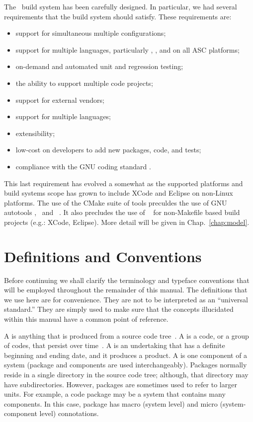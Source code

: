 The \draco\ build system has been carefully designed.  In particular,
we had several requirements that the build system should satisfy.
These requirements are:
\begin{itemize}
\item support for simultaneous multiple configurations;
\item support for multiple languages, particularly \cpp, \cc, and
  \python on all ASC platforms;
\item on-demand and automated unit and regression testing;
\item the ability to support multiple code projects;
\item support for external vendors;
\item support for multiple languages;
\item extensibility;
\item low-cost on developers to add new packages, code, and tests; 
\item compliance with the GNU coding standard \cite{gnu} .
\end{itemize}
This last requirement has evolved a somewhat as the supported
platforms and build systems scope has grown to include XCode and
Eclipse on non-Linux platforms.  The use of the CMake suite of tools
preculdes the use of GNU autotools ,
\autoconf\ and \automake~\cite{autoconf}.  
It also precludes the use of \make~\cite{gmake} for non-Makefile based
build projects (e.g.: XCode, Eclipse). More detail will be given in
Chap.~\ref{chap:model}. 


\section{Definitions and Conventions}

Before continuing we shall clarify the terminology and typeface
conventions that will be employed throughout the remainder of this
manual.  The definitions that we use here are for convenience.  They
are not to be interpreted as an ``universal standard.''  They are
simply used to make sure that the concepts illucidated within this
manual have a common point of reference.

A  is anything that is produced from a source code
tree~\cite{ja94}.  A  is a code, or a group of codes,
that persist over time~\cite{tn98}.  A  is an
undertaking that has a definite beginning and ending date, and it
produces a product.  A  is one component of a system
(package and components are used interchangeably).  Packages normally
reside in a single directory in the source code tree; although, that
directory may have subdirectories.  However, packages are sometimes
used to refer to larger units.  For example, a code package may be a
system that contains many components.  In this case, package has macro
(system level) and micro (system-component level) connotations.

